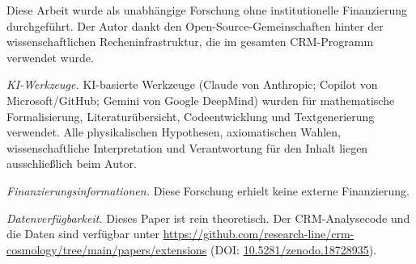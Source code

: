 \documentclass[aps,prd,twocolumn,superscriptaddress,nofootinbib]{revtex4-2}
\begin{document}
\begin{acknowledgments}
Diese Arbeit wurde als unabhängige Forschung ohne institutionelle Finanzierung durchgeführt. Der Autor dankt den Open-Source-Gemeinschaften hinter der wissenschaftlichen Recheninfrastruktur, die im gesamten CRM-Programm verwendet wurde.

\textit{KI-Werkzeuge.} KI-basierte Werkzeuge (Claude von Anthropic; Copilot von Microsoft/GitHub; Gemini von Google DeepMind) wurden für mathematische Formalisierung, Literaturübersicht, Codeentwicklung und Textgenerierung verwendet. Alle physikalischen Hypothesen, axiomatischen Wahlen, wissenschaftliche Interpretation und Verantwortung für den Inhalt liegen ausschließlich beim Autor.

\textit{Finanzierungsinformationen.} Diese Forschung erhielt keine externe Finanzierung.

\textit{Datenverfügbarkeit.} Dieses Paper ist rein theoretisch. Der CRM-Analysecode und die Daten sind verfügbar unter \url{https://github.com/research-line/crm-cosmology/tree/main/papers/extensions} (DOI: \href{https://doi.org/10.5281/zenodo.18728935}{10.5281/zenodo.18728935}).
\end{acknowledgments}


\end{document}

